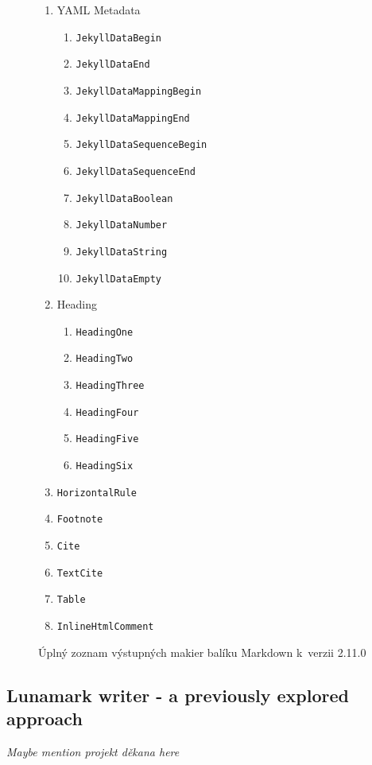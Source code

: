 \documentclass[
  digital,     %
  oneside,     %
  nosansbold,  %
  nocolorbold, %
  lof,         %
  lot,         %
]{fithesis4}
\begin{document}
\begin{figure}
\begin{multicols}{2}
\begin{enumerate}
      \item YAML Metadata
      \begin{enumerate}  %
        \item \texttt{JekyllDataBegin}
        \item \texttt{JekyllDataEnd}
        \item \texttt{JekyllDataMappingBegin}
        \item \texttt{JekyllDataMappingEnd}
        \item \texttt{JekyllDataSequenceBegin}
        \item \texttt{JekyllDataSequenceEnd}
        \item \texttt{JekyllDataBoolean}
        \item \texttt{JekyllDataNumber}
        \item \texttt{JekyllDataString}
        \item \texttt{JekyllDataEmpty}
      \end{enumerate}
      \item Heading
      \begin{enumerate}
        \item \texttt{HeadingOne}
        \item \texttt{HeadingTwo}
        \item \texttt{HeadingThree}
        \item \texttt{HeadingFour}
        \item \texttt{HeadingFive}
        \item \texttt{HeadingSix}
      \end{enumerate}
      \item \texttt{HorizontalRule}
      \item \texttt{Footnote}
      \item \texttt{Cite}
      \item \texttt{TextCite}
      \item \texttt{Table}
      \item \texttt{InlineHtmlComment}
    \end{enumerate}
  \end{multicols}
  \vspace*{-1em}
  \caption{Úplný zoznam výstupných makier balíku Markdown k~verzii 2.11.0}
  \label{fig:markdown-renderers}
\end{figure}

\subsection{Lunamark writer - a previously explored approach}
\emph{Maybe mention projekt děkana here}
\end{document}
